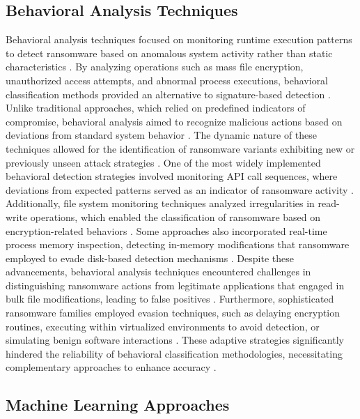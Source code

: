 \subsection{Behavioral Analysis Techniques}

Behavioral analysis techniques focused on monitoring runtime execution patterns to detect ransomware based on anomalous system activity rather than static characteristics \cite{moritaka2024enhanced}. By analyzing operations such as mass file encryption, unauthorized access attempts, and abnormal process executions, behavioral classification methods provided an alternative to signature-based detection \cite{pesem2024opcode}. Unlike traditional approaches, which relied on predefined indicators of compromise, behavioral analysis aimed to recognize malicious actions based on deviations from standard system behavior \cite{matae2024introducing}. The dynamic nature of these techniques allowed for the identification of ransomware variants exhibiting new or previously unseen attack strategies \cite{almeida2023analyzing}. One of the most widely implemented behavioral detection strategies involved monitoring API call sequences, where deviations from expected patterns served as an indicator of ransomware activity \cite{kosto2024automated}. Additionally, file system monitoring techniques analyzed irregularities in read-write operations, which enabled the classification of ransomware based on encryption-related behaviors \cite{welderman2024robust}. Some approaches also incorporated real-time process memory inspection, detecting in-memory modifications that ransomware employed to evade disk-based detection mechanisms \cite{mcintosh2024ransomware}. Despite these advancements, behavioral analysis techniques encountered challenges in distinguishing ransomware actions from legitimate applications that engaged in bulk file modifications, leading to false positives \cite{blowing2024performing}. Furthermore, sophisticated ransomware families employed evasion techniques, such as delaying encryption routines, executing within virtualized environments to avoid detection, or simulating benign software interactions \cite{blaas2024ransomware}. These adaptive strategies significantly hindered the reliability of behavioral classification methodologies, necessitating complementary approaches to enhance accuracy \cite{trit2024quantum}.

\subsection{Machine Learning Approaches}

